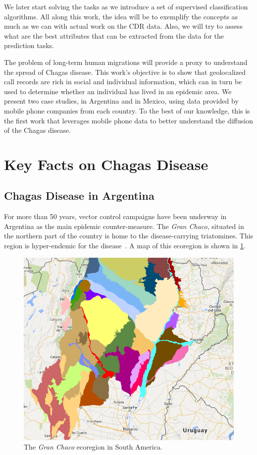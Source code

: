 We later start solving the tasks as we introduce a set of supervised classification algorithms.
All along this work, the idea will be to exemplify the concepts as much as we can with actual work on the CDR data.
Also, we will try to assess what are the best attributes that can be extracted from the data for the prediction tasks.

The problem of long-term human migrations will provide a proxy to understand the spread of Chagas disease.
This work's objective is to show that geolocalized call records are rich in social and individual information, which can in turn be used to determine whether an individual has lived in an epidemic area.
We present two case studies, in Argentina and in Mexico, using data provided by mobile phone companies from each country. %
To the best of our knowledge, this is the first work that leverages mobile phone data to better understand the diffusion of the Chagas disease.


\section{Key Facts on Chagas Disease}

\subsection{Chagas Disease in  Argentina}\label{endemic_zone_argentina}

For more than 50 years, vector control campaigns have been underway in Argentina as the main epidemic counter-measure.
The \textit{Gran Chaco}, situated in the northern part of the country is home to the disease-carrying triatomines.
This region is hyper-endemic for the disease~\citep{OPS2014mapa}.
A map of this ecoregion is shown in \cref{fig:granchaco}.

\begin{figure}[ht]
\centering
\includegraphics[width=0.75\columnwidth]{figures/Ambientes_GranChaco_TNC-Argentina/Ambientes_GranChaco_TNC-Argentina}
\caption{The \textit{Gran Chaco} ecoregion in South America.%
}
\label{fig:granchaco}
\end{figure}

